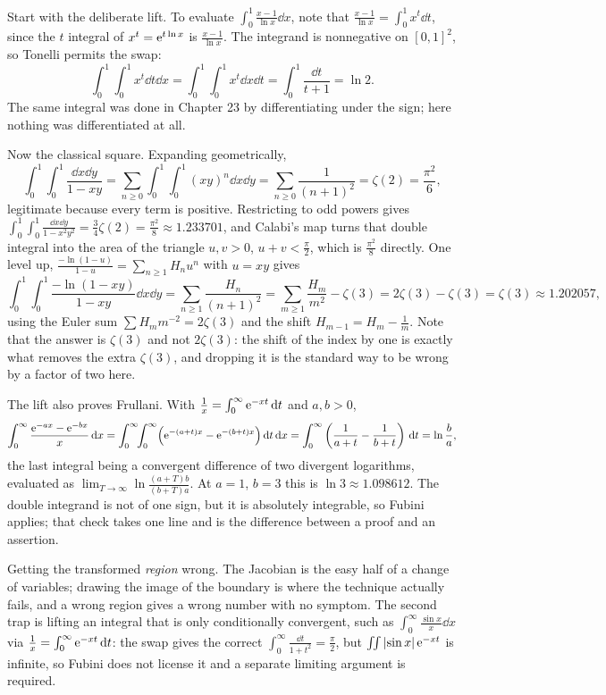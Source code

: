 \begin{worked}
Start with the deliberate lift. To evaluate $\int_0^1\frac{x-1}{\ln x}\dd x$, note that $\frac{x-1}{\ln x}=\int_0^1x^{t}\dd t$, since the $t$ integral of $x^{t}=\mathrm{e}^{t\ln x}$ is $\frac{x-1}{\ln x}$. The integrand is nonnegative on $[0,1]^{2}$, so Tonelli permits the swap:
\[\int_0^1\!\!\int_0^1x^{t}\dd t\dd x=\int_0^1\!\!\int_0^1x^{t}\dd x\dd t=\int_0^1\frac{\dd t}{t+1}=\ln2.\]
The same integral was done in Chapter 23 by differentiating under the sign; here nothing was differentiated at all.

Now the classical square. Expanding geometrically,
\[\int_0^1\!\!\int_0^1\frac{\dd x\dd y}{1-xy}=\sum_{n\geq0}\int_0^1\!\!\int_0^1(xy)^{n}\dd x\dd y=\sum_{n\geq0}\frac{1}{(n+1)^{2}}=\zeta(2)=\frac{\pi^{2}}{6},\]
legitimate because every term is positive. Restricting to odd powers gives $\int_0^1\!\!\int_0^1\frac{\dd x\dd y}{1-x^{2}y^{2}}=\tfrac34\zeta(2)=\tfrac{\pi^{2}}{8}\approx1.233701$, and Calabi's map turns that double integral into the area of the triangle $u,v>0$, $u+v<\tfrac{\pi}{2}$, which is $\tfrac{\pi^{2}}{8}$ directly. One level up, $\frac{-\ln(1-u)}{1-u}=\sum_{n\geq1}H_nu^{n}$ with $u=xy$ gives
\[\int_0^1\!\!\int_0^1\frac{-\ln(1-xy)}{1-xy}\dd x\dd y=\sum_{n\geq1}\frac{H_n}{(n+1)^{2}}=\sum_{m\geq1}\frac{H_m}{m^{2}}-\zeta(3)=2\zeta(3)-\zeta(3)=\zeta(3)\approx1.202057,\]
using the Euler sum $\sum H_m m^{-2}=2\zeta(3)$ and the shift $H_{m-1}=H_m-\tfrac1m$. Note that the answer is $\zeta(3)$ and not $2\zeta(3)$: the shift of the index by one is exactly what removes the extra $\zeta(3)$, and dropping it is the standard way to be wrong by a factor of two here.

The lift also proves Frullani. With $\frac1x=\int_0^\infty \mathrm{e}^{-xt}\,\mathrm{d} t$ and $a,b>0$,
\[\int_0^{\infty}\frac{\mathrm{e}^{-ax}-\mathrm{e}^{-bx}}{x}\,\mathrm{d} x=\int_0^{\infty}\!\!\int_0^{\infty}\Bigl(\mathrm{e}^{-(a+t)x}-\mathrm{e}^{-(b+t)x}\Bigr)\,\mathrm{d} t\,\mathrm{d} x=\int_0^{\infty}\left(\frac{1}{a+t}-\frac{1}{b+t}\right)\,\mathrm{d} t=\ln\frac{b}{a},\]
the last integral being a convergent difference of two divergent logarithms, evaluated as $\lim_{T\to\infty}\ln\frac{(a+T)b}{(b+T)a}$. At $a=1$, $b=3$ this is $\ln3\approx1.098612$. The double integrand is not of one sign, but it is absolutely integrable, so Fubini applies; that check takes one line and is the difference between a proof and an assertion.
\end{worked}

\begin{trap}
Getting the transformed \emph{region} wrong. The Jacobian is the easy half of a change of variables; drawing the image of the boundary is where the technique actually fails, and a wrong region gives a wrong number with no symptom. The second trap is lifting an integral that is only conditionally convergent, such as $\int_0^\infty\frac{\sin x}{x}\dd x$ via $\frac1x=\int_0^\infty \mathrm{e}^{-xt}\,\mathrm{d} t$: the swap gives the correct $\int_0^\infty\frac{\dd t}{1+t^{2}}=\frac{\pi}{2}$, but $\iint\left\lvert \sin x\right\rvert\mathrm{e}^{-xt}$ is infinite, so Fubini does not license it and a separate limiting argument is required.
\end{trap}

